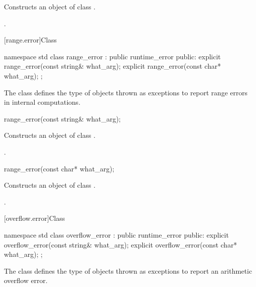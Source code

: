 \begin{itemdescr}
\pnum
\effects
Constructs an object of class
.

\pnum
\postcondition
{}.
\end{itemdescr}

[range.error]{Class }

%
\begin{codeblock}
namespace std {
  class range_error : public runtime_error {
  public:
    explicit range_error(const string& what_arg);
    explicit range_error(const char* what_arg);
  };
}
\end{codeblock}

\pnum
The class
defines the type of objects thrown as exceptions to report range errors
in internal computations.

%
\begin{itemdecl}
range_error(const string& what_arg);
\end{itemdecl}

\begin{itemdescr}
\pnum
\effects
Constructs an object of class
.

\pnum
\postcondition
{}.
\end{itemdescr}

%
\begin{itemdecl}
range_error(const char* what_arg);
\end{itemdecl}

\begin{itemdescr}
\pnum
\effects
Constructs an object of class
.

\pnum
\postcondition
{}.
\end{itemdescr}

[overflow.error]{Class }

%
\begin{codeblock}
namespace std {
  class overflow_error : public runtime_error {
  public:
    explicit overflow_error(const string& what_arg);
    explicit overflow_error(const char* what_arg);
  };
}
\end{codeblock}

\pnum
The class
defines the type of objects thrown as exceptions to report an arithmetic overflow error.

